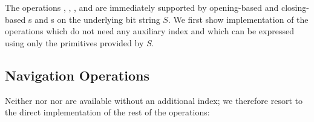 \bigbreak

The operations \preRank{}, \preSelect{}, \postRank{}, and \postSelect{} are immediately supported by opening-based and closing-based \rank{}s and \select{}s on the underlying bit string $S$.
We first show implementation of the operations which do not need any auxiliary index and which can be expressed using only the primitives provided by $S$.

\begin{algorithm}
\begin{algorithmic}
	\State {}
\EndFunction
\end{algorithmic}
\end{algorithm}

\begin{algorithm}
\begin{algorithmic}
	\State {} 
\EndFunction
\end{algorithmic}
\end{algorithm}

\subsection{Navigation Operations}

\begin{algorithm}
\begin{algorithmic}
	\State {}
\EndFunction
\end{algorithmic}
\end{algorithm}

Neither \degree{} nor \childRank{} nor \childSelect{} are available without an additional index; we therefore resort to the direct implementation of the rest of the \childAny{} operations:

\begin{algorithm}
\begin{algorithmic}
	\State {}
\EndFunction
\end{algorithmic}
\end{algorithm}

\begin{algorithm}
\begin{algorithmic}
	\State {}
\EndFunction
\end{algorithmic}
\end{algorithm}

